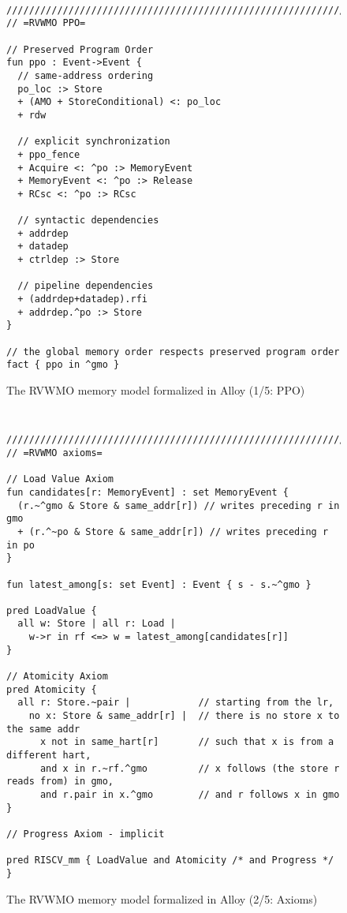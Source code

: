 \begin{figure}[h!]
  {
  \tt\bfseries\centering\footnotesize
  \begin{lstlisting}
////////////////////////////////////////////////////////////////////////////////
// =RVWMO PPO=

// Preserved Program Order
fun ppo : Event->Event {
  // same-address ordering
  po_loc :> Store
  + (AMO + StoreConditional) <: po_loc
  + rdw

  // explicit synchronization
  + ppo_fence
  + Acquire <: ^po :> MemoryEvent
  + MemoryEvent <: ^po :> Release
  + RCsc <: ^po :> RCsc

  // syntactic dependencies
  + addrdep
  + datadep
  + ctrldep :> Store

  // pipeline dependencies
  + (addrdep+datadep).rfi
  + addrdep.^po :> Store
}

// the global memory order respects preserved program order
fact { ppo in ^gmo }
\end{lstlisting}}
  \caption{The RVWMO memory model formalized in Alloy (1/5: PPO)}
  \label{fig:alloy1}
\end{figure}
\begin{figure}[h!]
  {
  \tt\bfseries\centering\footnotesize
  \begin{lstlisting}
////////////////////////////////////////////////////////////////////////////////
// =RVWMO axioms=

// Load Value Axiom
fun candidates[r: MemoryEvent] : set MemoryEvent {
  (r.~^gmo & Store & same_addr[r]) // writes preceding r in gmo
  + (r.^~po & Store & same_addr[r]) // writes preceding r in po
}

fun latest_among[s: set Event] : Event { s - s.~^gmo }

pred LoadValue {
  all w: Store | all r: Load |
    w->r in rf <=> w = latest_among[candidates[r]]
}

// Atomicity Axiom
pred Atomicity {
  all r: Store.~pair |            // starting from the lr,
    no x: Store & same_addr[r] |  // there is no store x to the same addr
      x not in same_hart[r]       // such that x is from a different hart,
      and x in r.~rf.^gmo         // x follows (the store r reads from) in gmo,
      and r.pair in x.^gmo        // and r follows x in gmo
}

// Progress Axiom - implicit

pred RISCV_mm { LoadValue and Atomicity /* and Progress */ }

\end{lstlisting}}
  \caption{The RVWMO memory model formalized in Alloy (2/5: Axioms)}
  \label{fig:alloy2}
\end{figure}
